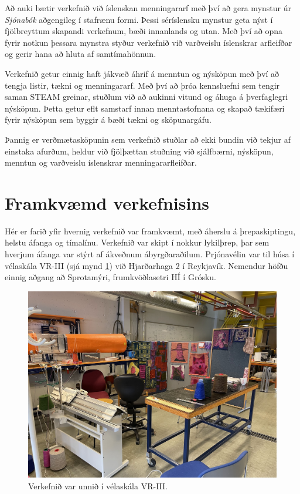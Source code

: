 \documentclass[a4paper,12pt,twoside]{article}
\begin{document}
Að auki bætir verkefnið við íslenskan menningararf með því að gera mynstur úr \textit{Sjónabók} aðgengileg í stafrænu formi. Þessi sér\-íslensku mynstur geta nýst í fjölbreyttum skapandi verkefnum, bæði innanlands og utan. Með því að opna fyrir notkun þessara mynstra styður verkefnið við varðveislu íslenskrar arfleifðar og gerir hana að hluta af samtímahönnun.

Verkefnið getur einnig haft jákvæð áhrif á menntun og nýsköpun með því að tengja listir, tækni og menningararf. Með því að þróa kennsluefni sem tengir saman STEAM greinar, stuðlum við að aukinni vitund og áhuga á þverfaglegri nýsköpun. Þetta getur eflt samstarf innan menntastofnana og skapað tækifæri fyrir nýsköpun sem byggir á bæði tækni og sköpunargáfu.

Þannig er verðmætasköpunin sem verkefnið stuðlar að ekki bundin við tekjur af einstaka afurðum, heldur við fjölþættan stuðning við sjálfbærni, nýsköpun, menntun og varðveislu íslenskrar menningararfleifðar.

\section{Framkvæmd verkefnisins}
Hér er farið yfir hvernig verkefnið var framkvæmt, með áherslu á þrepaskiptingu, helstu áfanga og tímalínu. Verkefnið var skipt í nokkur lykilþrep, þar sem hverjum áfanga var stýrt af ákveðnum ábyrgðaraðilum. Prjónavélin var til húsa í vélaskála VR-III (sjá mynd \ref{fig:workshop}) við Hjarðarhaga 2 í Reykjavík. Nemendur höfðu einnig aðgang að Sprotamýri, frumkvöðlasetri HÍ í Grósku.

\begin{figure}[H]
    \centering
    \includegraphics[width=0.9\linewidth]{myndir/workshop.jpg}
    \caption{Verkefnið var unnið í vélaskála VR-III.}
    \label{fig:workshop}
\end{figure}
\end{document}
